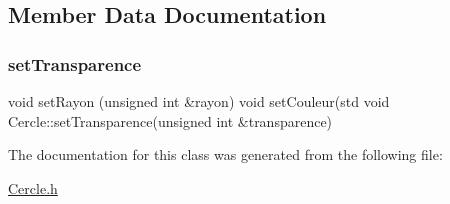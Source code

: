 \subsection{Member Data Documentation}
\mbox{\label{class_cercle_a084cb5b26bfecd94eb4336e5b203c885}} 
\subsubsection{\texorpdfstring{set\+Transparence}{setTransparence}}
{\footnotesize\ttfamily void set\+Rayon (unsigned int \&rayon) void set\+Couleur(std void Cercle\+::set\+Transparence(unsigned int \&transparence)}



The documentation for this class was generated from the following file\+:\begin{DoxyCompactItemize}
\item 
\hyperlink{_cercle_8h}{Cercle.\+h}\end{DoxyCompactItemize}
